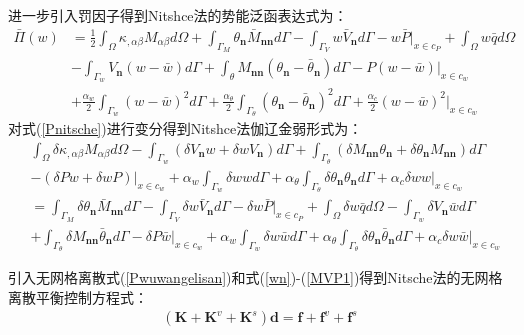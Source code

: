 进一步引入罚因子得到Nitshce法的势能泛函表达式为：
\begin{equation}\label{Pnitsche}
\begin{split}
    \bar{\Pi}(w)&=\frac{1}{2}\int_{\Omega}\kappa_{,\alpha\beta}M_{\alpha\beta}d\Omega+\int_{\Gamma_M}\theta_{\pmb{n}}\bar{M}_{\pmb{nn}}d\Gamma-\int_{\Gamma_V}w\bar{V}_{\pmb{n}}d\Gamma-w\bar{P}\vert_{x\in c_P}+\int_{\Omega}w\bar{q}d\Omega\\
&-\int_{\Gamma_w}V_{\pmb{n}}(w-\bar{w})d\Gamma+\int_{\theta}M_{\pmb{nn}}(\theta_{\pmb{n}}-\bar{\theta}_{\pmb{n}})d\Gamma-P(w-\bar{w})\vert_{x\in c_w}\\
&+\frac{\alpha_w}{2}\int_{\Gamma_w}(w-\bar{w})^2d\Gamma+\frac{\alpha_{\theta}}{2}\int_{\Gamma_{\theta}}(\theta_{\pmb{n}}-\bar{\theta}_{\pmb{n}})^2d\Gamma+\frac{\alpha_c}{2}(w-\bar{w})^2\vert_{x\in c_w}
\end{split}
\end{equation}
对式(\ref{Pnitsche})进行变分得到Nitshce法伽辽金弱形式为：
\begin{equation}
\begin{split}
&\int_{\Omega}\delta\kappa_{,\alpha\beta}M_{\alpha\beta}d\Omega-\int_{\Gamma_w}(\delta V_{\pmb{n}}w+\delta wV_{\pmb{n}})d\Gamma+\int_{\Gamma_{\theta}}(\delta M_{\pmb{nn}}\theta_{\pmb{n}}+\delta\theta_{\pmb{n}}M_{\pmb{nn}})d\Gamma\\&-(\delta Pw+\delta wP)\vert_{x\in c_w}
+\alpha_w\int_{\Gamma_w}\delta wwd\Gamma+\alpha_{\theta}\int_{\Gamma_{\theta}}\delta\theta_{\pmb{n}}\theta_{\pmb{n}}d\Gamma+\alpha_c\delta ww\vert_{x\in c_w}\\
&=\int_{\Gamma_M}\delta\theta_{\pmb{n}}\bar{M}_{\pmb{nn}}d\Gamma-\int_{\Gamma_V}\delta w\bar{V}_{\pmb{n}}d\Gamma-\delta w\bar{P}\vert_{x\in c_P}+\int_{\Omega}\delta w\bar{q}d\Omega
-\int_{\Gamma_w}\delta V_{\pmb{n}}\bar{w}d\Gamma\\&+\int_{\Gamma_{\theta}}\delta M_{\pmb{nn}}\bar{\theta}_{\pmb{n}}d\Gamma-\delta P\bar{w}\vert_{x\in c_w}
+\alpha_w\int_{\Gamma_w}\delta w\bar{w}d\Gamma+\alpha_{\theta}\int_{\Gamma_{\theta}}\delta\theta_{\pmb{n}}\bar{\theta}_{\pmb{n}}d\Gamma+\alpha_c\delta w\bar{w}\vert_{x\in c_w}
\end{split}
\end{equation}\par
引入无网格离散式(\ref{Pwuwangelisan})和式(\ref{wn})-(\ref{MVP1})得到Nitsche法的无网格离散平衡控制方程式：
\begin{equation}
\begin{split}
    (\pmb{K}+\pmb{K}^v+\pmb{K}^s)\pmb{d}=\pmb{f}+\pmb{f}^v+\pmb{f}^s
\end{split}
\end{equation}
